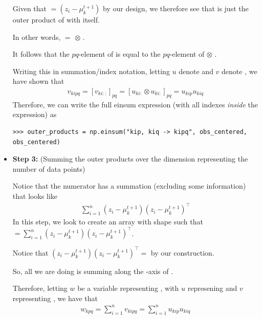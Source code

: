 \begin{itemize}
Given that  $= (z_i - \mu_k^{t+1})$ by our design, we therefore see that \newline 
{} is just the outer product of  with itself.

In other words,  \newline {} $=$   $\otimes$ .

It follows that the $pq$-element of   is equal to the $pq$-element of  $\otimes$ .

Writing this in summation/index notation, letting $u$ denote  and $v$ denote \newline {}, we have shown that 
\begin{align*}
v_{kipq} = [v_{ki::}]_{pq} = [u_{ki:} \otimes u_{ki:}]_{pq} = u_{kip} u_{kiq}
\end{align*}
Therefore, we can write the full einsum expression (with all indexes \emph{inside} the expression) as
\begin{lstlisting}
>>> outer_products = np.einsum("kip, kiq -> kipq", obs_centered, obs_centered)
\end{lstlisting}


\item \textbf{Step 3:} (Summing the outer products over the dimension representing the number of data points)

Notice that the numerator has a summation (excluding some information) that looks like 
\begin{align*}
	\sum_{i=1}^{n} (z_i - \mu_k^{t+1}) (z_i - \mu_k^{t+1})^\top
\end{align*}
In this step, we look to create an array  with shape  such that \newline {} $ = \sum_{i=1}^{n} (z_i - \mu_k^{t+1}) (z_i - \mu_k^{t+1})^\top$.

Notice that $(z_i - \mu_k^{t+1}) (z_i - \mu_k^{t+1})^\top = $  by our construction.

So, all we are doing is summing along the -axis of . 

Therefore, letting $w$ be a variable representing , with $u$ represening  and $v$ representing , we have that
\begin{align*}
w_{kpq} = \sum_{i=1}^{n} v_{kipq} = \sum_{i=1}^{n} u_{kip} u_{kiq}
\end{align*} 


\end{itemize}

